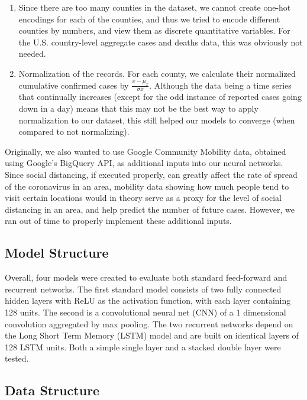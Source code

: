﻿\documentclass{article}
\begin{document}
\begin{multicols}{2}
\begin{enumerate}
  
    \item Since there are too many counties in the dataset, we cannot create
      one-hot encodings for each of the counties, and thus we tried to encode
      different counties by numbers, and view them as discrete quantitative variables.
      For the U.S. country-level aggregate cases and deaths data, this was obviously
      not needed.

      \item Normalization of the records. For each county, we calculate their
        normalized cumulative confirmed cases by $\frac{x-\mu_{x}}{\sigma{x}}$. Although
        the data being a time series that continually increases (except for the odd
        instance of reported cases going down in a day) means that this may not be the
        best way to apply normalization to our dataset, this still helped our models to
        converge (when compared to not normalizing).

\end{enumerate}

Originally, we also wanted to use Google Community Mobility data, obtained using
Google’s BigQuery API, as additional inputs into our neural networks. Since
social distancing, if executed properly, can greatly affect the rate of spread
of the coronavirus in an area, mobility data showing how much people tend to
visit certain locations would in theory serve as a proxy for the level of social
distancing in an area, and help predict the number of future cases. However, we
ran out of time to properly implement these additional inputs.

\subsection*{Model Structure}

Overall, four models were created to evaluate both standard feed-forward
and recurrent networks.
The first standard model consists of two fully connected hidden layers with ReLU
as the activation function, with each layer containing 128 units.
The second is a convolutional neural net (CNN) of a 1 dimensional convolution
aggregated by max pooling.
The two recurrent networks depend on the Long Short Term Memory (LSTM) model and
are built on identical layers of 128 LSTM units.
Both a simple single layer and a stacked double layer were tested.

\subsection*{Data Structure}


\end{multicols}
\end{document}

